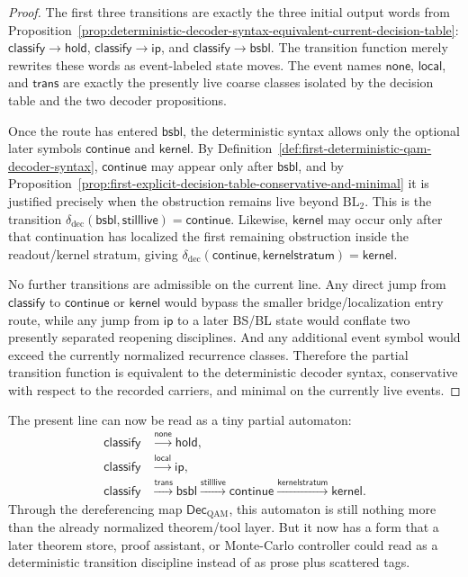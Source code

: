 \begin{proof}
The first three transitions are exactly the three initial output words from Proposition~\ref{prop:deterministic-decoder-syntax-equivalent-current-decision-table}: \(\mathsf{classify}\to\mathsf{hold}\), \(\mathsf{classify}\to\mathsf{ip}\), and \(\mathsf{classify}\to\mathsf{bsbl}\). The transition function merely rewrites these words as event-labeled state moves. The event names \(\mathsf{none}\), \(\mathsf{local}\), and \(\mathsf{trans}\) are exactly the presently live coarse classes isolated by the decision table and the two decoder propositions.

Once the route has entered \(\mathsf{bsbl}\), the deterministic syntax allows only the optional later symbols \(\mathsf{continue}\) and \(\mathsf{kernel}\). By Definition~\ref{def:first-deterministic-qam-decoder-syntax}, \(\mathsf{continue}\) may appear only after \(\mathsf{bsbl}\), and by Proposition~\ref{prop:first-explicit-decision-table-conservative-and-minimal} it is justified precisely when the obstruction remains live beyond \(\mathrm{BL}_2\). This is the transition \(\delta_{\mathrm{dec}}(\mathsf{bsbl},\mathsf{stilllive})=\mathsf{continue}\). Likewise, \(\mathsf{kernel}\) may occur only after that continuation has localized the first remaining obstruction inside the readout/kernel stratum, giving \(\delta_{\mathrm{dec}}(\mathsf{continue},\mathsf{kernelstratum})=\mathsf{kernel}\).

No further transitions are admissible on the current line. Any direct jump from \(\mathsf{classify}\) to \(\mathsf{continue}\) or \(\mathsf{kernel}\) would bypass the smaller bridge/localization entry route, while any jump from \(\mathsf{ip}\) to a later BS/BL state would conflate two presently separated reopening disciplines. And any additional event symbol would exceed the currently normalized recurrence classes. Therefore the partial transition function is equivalent to the deterministic decoder syntax, conservative with respect to the recorded carriers, and minimal on the currently live events.
\end{proof}

\begin{remark}
\label{rem:immediate-automaton-reading-current-decoder}
The present line can now be read as a tiny partial automaton:
\[
\begin{aligned}
\mathsf{classify} &\xrightarrow{\mathsf{none}} \mathsf{hold},\\
\mathsf{classify} &\xrightarrow{\mathsf{local}} \mathsf{ip},\\
\mathsf{classify} &\xrightarrow{\mathsf{trans}} \mathsf{bsbl}
\xrightarrow{\mathsf{stilllive}} \mathsf{continue}
\xrightarrow{\mathsf{kernelstratum}} \mathsf{kernel}.
\end{aligned}
\]
Through the dereferencing map \(\mathsf{Dec}_{\mathrm{QAM}}\), this automaton is still nothing more than the already normalized theorem/tool layer. But it now has a form that a later theorem store, proof assistant, or Monte-Carlo controller could read as a deterministic transition discipline instead of as prose plus scattered tags.
\end{remark}


